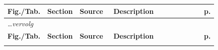 \renewcommand{\arraystretch}{1.5}
\begin{longtable}{|p{0.05\linewidth}|p{0.14\linewidth}|p{0.16\linewidth}|p{0.43\linewidth}|p{0.06\linewidth}|}

\hline
\textcolor{textprimary}{\small\bfseries\sffamily Fig./Tab.} &
\textcolor{textprimary}{\small\bfseries\sffamily Section} &
\textcolor{textprimary}{\small\bfseries\sffamily Source} &
\textcolor{textprimary}{\small\bfseries\sffamily Description} &
\textcolor{textprimary}{\small\bfseries\sffamily p.} \\
\hline\hline
\endfirsthead

\hline
\multicolumn{5}{|l|}{\textcolor{textmuted}{\small\itshape \ldots vervolg}} \\
\hline
\textcolor{textprimary}{\small\bfseries\sffamily Fig./Tab.} &
\textcolor{textprimary}{\small\bfseries\sffamily Section} &
\textcolor{textprimary}{\small\bfseries\sffamily Source} &
\textcolor{textprimary}{\small\bfseries\sffamily Description} &
\textcolor{textprimary}{\small\bfseries\sffamily p.} \\
\hline\hline
\endhead

\hline
\endlastfoot


\end{longtable}
